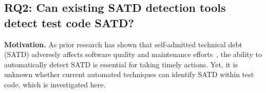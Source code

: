 
\subsection{RQ2: Can existing SATD detection tools detect test code SATD?}
\textbf{Motivation.} As prior research has shown that self-admitted technical debt (SATD) adversely affects software quality and maintenance efforts~\cite{chowdhury_evidence_2025}, the ability to automatically detect SATD is essential for taking timely actions. Yet, it is unknown whether current automated techniques can identify SATD within test code, which is investigated here.


